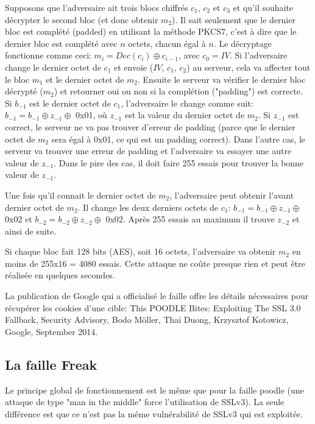 Supposons que l'adversaire ait trois blocs chiffrés $c_1$, $c_2$ et $c_3$ et qu'il souhaite décrypter le second bloc (et donc obtenir $m_2$). Il sait seulement que le dernier bloc est complété (padded) en utilisant la méthode PKCS7, c'est à dire que le dernier bloc est complété avec $n$ octets, chacun égal à $n$.
Le décryptage fonctionne comme ceci: $m_i = Dec(c_i) \oplus c_{i-1}$, avec $c_0 = IV$. Si l'adversaire change le dernier octet de $c_1$ et envoie ($IV$, $c_1$, $c_2$) au serveur, cela va affecter tout le bloc $m_1$ et le dernier octet de $m_2$. Ensuite le serveur va vérifier le dernier bloc décrypté ($m_2$) et retourner oui ou non si la complétion ("padding") est correcte.
Si $b_{-1}$ est le dernier octet de $c_1$, l'adversaire le change comme suit: $b_{-1} = b_{-1} \oplus z_{-1} \oplus$ 0x01, où $z_{-1}$ est la valeur du dernier octet de $m_2$. Si $z_{-1}$ est correct, le serveur ne va pas trouver d'erreur de padding (parce que le dernier octet de $m_2$ sera égal à 0x01, ce qui est un padding correct). Dans l'autre cas, le serveur va trouver une erreur de padding et l'adversaire va essayer une autre valeur de $z_{-1}$. Dans le pire des cas, il doit faire 255 essais pour trouver la bonne valeur de $z_{-1}$.

Une fois qu'il connait le dernier octet de $m_2$, l'adversaire peut obtenir l'avant dernier octet de $m_2$. Il change les deux derniers octets de $c_1$: $b_{-1} = b_{-1} \oplus z_{-1} \oplus$ 0x02 et $b_{-2} = b_{-2} \oplus z_{-2} \oplus$ 0x02. Après 255 essais au maximum il trouve $z_{-2}$ et ainsi de suite. 

Si chaque bloc fait 128 bits (AES), soit 16 octets, l'adversaire va obtenir $m_2$ en moins de 255x16 = 4080 essais. Cette attaque ne co\^ute presque rien et peut \^etre réalisée en quelques secondes.

La publication de Google qui a officialisé le faille offre les détails nécessaires pour récupérer les cookies d'une cible: This POODLE Bites: Exploiting The SSL 3.0 Fallback, Security Advisory, Bodo Möller, Thai Duong, Krzysztof Kotowicz, Google, September 2014.


\subsection{La faille Freak}

Le principe global de fonctionnement est le m\^eme que pour la faille poodle (une attaque de type "man in the middle" force l'utilisation de SSLv3). La seule différence est que ce n'est pas la m\^eme vulnérabilité de SSLv3 qui est exploitée.

